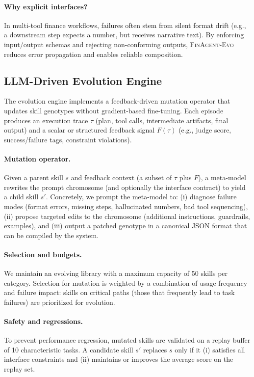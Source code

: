 \documentclass{article}
\begin{document}
\paragraph{Why explicit interfaces?}
In multi-tool finance workflows, failures often stem from silent format drift (e.g., a downstream step expects a number, but receives narrative text). By enforcing input/output schemas and rejecting non-conforming outputs, \textsc{FinAgent-Evo} reduces error propagation and enables reliable composition.

\subsection{LLM-Driven Evolution Engine}
The evolution engine implements a feedback-driven mutation operator that updates skill genotypes without gradient-based fine-tuning. Each episode produces an execution trace $\tau$ (plan, tool calls, intermediate artifacts, final output) and a scalar or structured feedback signal $F(\tau)$ (e.g., judge score, success/failure tags, constraint violations).

\paragraph{Mutation operator.}
Given a parent skill $s$ and feedback context (a subset of $\tau$ plus $F$), a meta-model rewrites the prompt chromosome (and optionally the interface contract) to yield a child skill $s'$. Concretely, we prompt the meta-model to:
(i) diagnose failure modes (format errors, missing steps, hallucinated numbers, bad tool sequencing),
(ii) propose targeted edits to the chromosome (additional instructions, guardrails, examples),
and (iii) output a patched genotype in a canonical JSON format that can be compiled by the system.

\paragraph{Selection and budgets.}
We maintain an evolving library with a maximum capacity of 50 skills per category. Selection for mutation is weighted by a combination of usage frequency and failure impact: skills on critical paths (those that frequently lead to task failures) are prioritized for evolution.

\paragraph{Safety and regressions.}
To prevent performance regression, mutated skills are validated on a replay buffer of 10 characteristic tasks. A candidate skill $s'$ replaces $s$ only if it (i) satisfies all interface constraints and (ii) maintains or improves the average score on the replay set.
\end{document}
